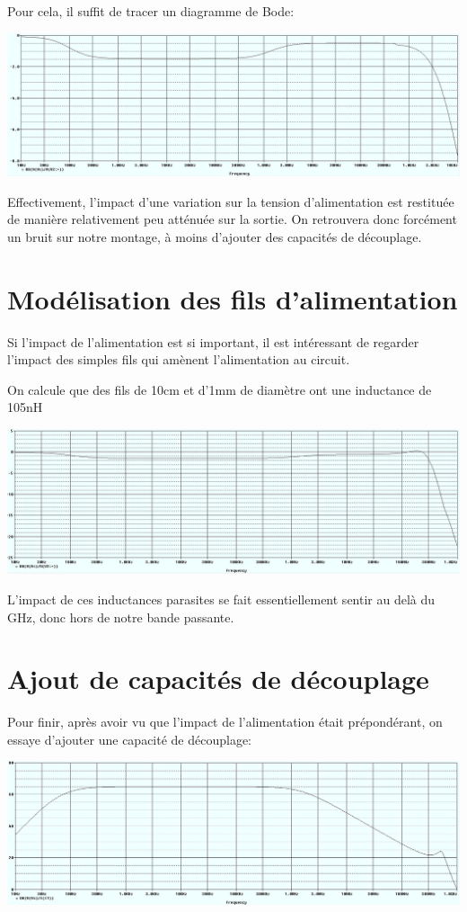 \documentclass{article}
\begin{document}
Pour cela, il suffit de tracer un diagramme de Bode:

\includegraphics[width=\linewidth]{bode_alim.jpg}

Effectivement, l’impact d’une variation sur la tension d’alimentation est restituée de manière relativement peu atténuée sur la sortie. On retrouvera donc forcément un bruit sur notre montage, à moins d’ajouter des capacités de découplage.

\section{Modélisation des fils d’alimentation}

Si l’impact de l’alimentation est si important, il est intéressant de regarder l’impact des simples fils qui amènent l’alimentation au circuit.

On calcule que des fils de 10cm et d’1mm de diamètre ont une inductance de 105nH

\includegraphics[width=\linewidth]{bode_alim_fil_reel.jpg}

L’impact de ces inductances parasites se fait essentiellement sentir au delà du GHz, donc hors de notre bande passante.

\section{Ajout de capacités de découplage}

Pour finir, après avoir vu que l’impact de l’alimentation était prépondérant, on essaye d’ajouter une capacité de découplage:

\includegraphics[width=\linewidth]{bode_alim_fil_reel_decouple.jpg}
\end{document}
